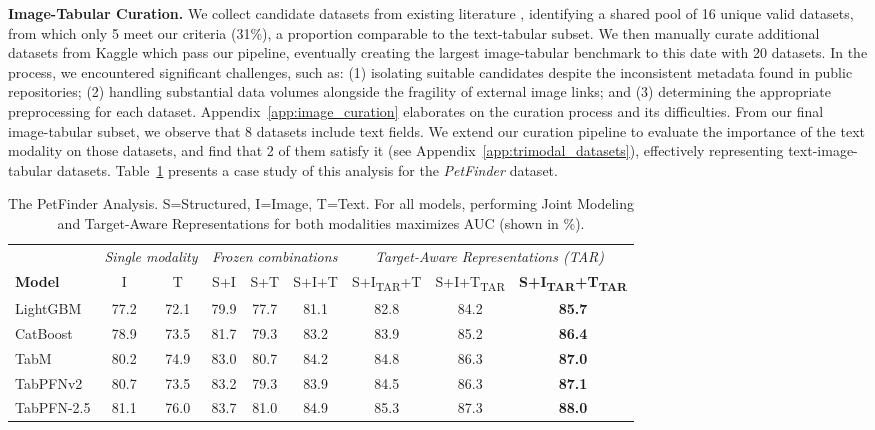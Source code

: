 \documentclass{article}
\begin{document}
\textbf{Image-Tabular Curation.}\label{par:image_tabular_curation} We collect candidate datasets from existing literature \cite{lu_mug_2023, tang_bag_2024, luo_time_2025, kim_multimodalpfn_2025}, identifying a shared pool of 16 unique valid datasets, from which only 5 meet our criteria (31\%), a proportion comparable to the text-tabular subset. We then manually curate additional datasets from Kaggle which pass our pipeline, eventually creating the largest image-tabular benchmark to this date with 20 datasets. In the process, we encountered significant challenges, such as: (1) isolating suitable candidates despite the inconsistent metadata found in public repositories; (2) handling substantial data volumes alongside the fragility of external image links; and (3) determining the appropriate preprocessing for each dataset. Appendix~\ref{app:image_curation} elaborates on the curation process and its difficulties. From our final image-tabular subset, we observe that 8 datasets include text fields. We extend our curation pipeline to evaluate the importance of the text modality on those datasets, and find that 2 of them satisfy it (see Appendix~\ref{app:trimodal_datasets}), effectively representing text-image-tabular datasets. Table~\ref{tab:petfinder} presents a case study of this analysis for the \textit{PetFinder} dataset.

\begin{table}[ht]
\centering
\caption{The PetFinder Analysis. S=Structured, I=Image, T=Text. For all models, performing Joint Modeling and Target-Aware Representations for both modalities maximizes AUC (shown in \%).}


\label{tab:petfinder}
\setlength{\tabcolsep}{4pt}
\small
\begin{tabular}{l cc ccc ccc}
\toprule
 & \multicolumn{2}{c}{\textit{Single modality}} & \multicolumn{3}{c}{\textit{Frozen combinations}} & \multicolumn{3}{c}{\textit{Target-Aware Representations (TAR)}} \\
\cmidrule(lr){2-3}\cmidrule(lr){4-6}\cmidrule(lr){7-9}
\textbf{Model} & I & T & S+I & S+T & S+I+T & S+I\textsubscript{TAR}+T & S+I+T\textsubscript{TAR} & \textbf{S+I\textsubscript{TAR}+T\textsubscript{TAR}} \\
\midrule
LightGBM    & 77.2 & 72.1 & 79.9 & 77.7 & 81.1 & 82.8 & 84.2 & \textbf{85.7} \\
CatBoost    & 78.9 & 73.5 & 81.7 & 79.3 & 83.2 & 83.9 & 85.2 & \textbf{86.4} \\
TabM        & 80.2 & 74.9 & 83.0 & 80.7 & 84.2 & 84.8 & 86.3 & \textbf{87.0} \\
TabPFNv2   & 80.7 & 73.5 & 83.2 & 79.3 & 83.9 & 84.5 & 86.3 & \textbf{87.1} \\
TabPFN-2.5 & 81.1 & 76.0 & 83.7 & 81.0 & 84.9 & 85.3 & 87.3 & \textbf{88.0} \\
\bottomrule
\end{tabular}
\end{table}
\end{document}
